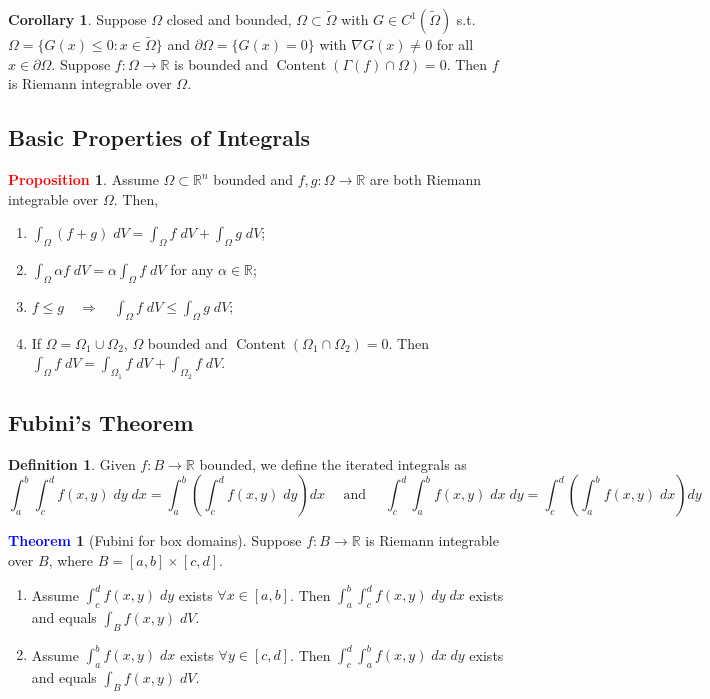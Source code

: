 \documentclass[11pt]{article}
\theoremstyle{definition}
\theoremstyle{definition}
\newcommand{\R}[0]{\mathbb{R}}
\DeclareMathOperator{\Content}{Content}
\newtheorem{theorem}{\textcolor{blue}{Theorem}}
\newtheorem{corollary}{Corollary}
\theoremstyle{definition}
\newtheorem{definition}{\textcolor{OliveGreen}{Definition}}
\newtheorem{prop}{\textcolor{red}{Proposition}}
\theoremstyle{remark}
\begin{document}
\begin{corollary}
    Suppose $\Omega$ closed and bounded, $\Omega \subset \tilde{\Omega}$ with $G \in C^1(\tilde{\Omega})$ s.t.
    $\Omega = \{G(x) \leq 0 : x \in \tilde{\Omega} \}$ and $\partial \Omega = \{G(x) = 0 \}$ with $\nabla G(x) \neq 0$ 
    for all $x \in \partial \Omega$. Suppose $f : \Omega \to \R$ is bounded and $\Content(\Gamma(f) \cap \Omega) = 0$.
    Then $f$ is Riemann integrable over $\Omega$.  
\end{corollary}


\subsection{Basic Properties of Integrals}

\begin{prop}
    Assume $\Omega \subset \R^n$ bounded and $f, g : \Omega \to \R$ are both Riemann integrable over $\Omega$.
    Then,
    \begin{enumerate}
        \item $\int_{\Omega} (f + g) \; dV = \int_{\Omega} f \; dV + \int_{\Omega} g \; dV$;
        \item $\int_{\Omega} \alpha f \; dV = \alpha \int_{\Omega} f \; dV$ for any $\alpha \in \R$;
        \item $f \leq g \quad \Rightarrow \quad \int_{\Omega} f \; dV \leq \int_{\Omega} g \; dV$;
        \item If $\Omega = \Omega_1 \cup \Omega_2$, $\Omega$ bounded and $\Content(\Omega_1 \cap \Omega_2) = 0$.
        Then $\int_{\Omega} f \; dV = \int_{\Omega_1} f \; dV + \int_{\Omega_2} f \; dV$.     
    \end{enumerate}   
\end{prop}

\subsection{Fubini's Theorem}

\begin{definition}
    Given $f : B \to \R$ bounded, we define the iterated integrals as
    \[
        \int_a^b \int_c^d f(x,y) \; dy \; dx = \int_a^b \left( \int_c^d f(x,y) \; dy \right) dx \quad \text{ and } \quad \int_c^d \int_a^b f(x,y) \; dx \; dy = \int_c^d \left( \int_a^b f(x,y) \; dx \right) dy
    \] 
\end{definition}

\begin{theorem}[Fubini for box domains]
    Suppose $f : B \to \R$ is Riemann integrable over $B$, where $B = [a,b] \times [c,d]$.
    \begin{enumerate}
        \item Assume $\int_c^d f(x,y) \; dy$ exists $\forall x \in [a,b]$. Then $\int_a^b \int_c^d f(x,y) \; dy \; dx$ exists and equals $\int_B f(x,y) \; dV$.
        \item Assume $\int_a^b f(x,y) \; dx$ exists $\forall y \in [c,d]$. Then $\int_c^d \int_a^b f(x,y) \; dx \; dy$ exists and equals $\int_B f(x,y) \; dV$.  
    \end{enumerate}   
    
\end{theorem}
\end{document}
